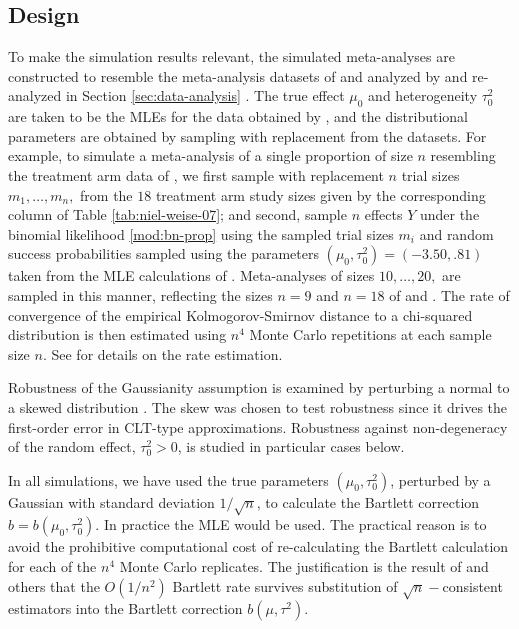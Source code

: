\documentclass[12pt]{article}
\newcommand{\Y}{Y}
\newcommand{\n}{n}
\newcommand{\munull}{\mu_0}
\newcommand{\tausqnull}{\tau^2_{0}}
\begin{document}
\subsection{Design}
To make the simulation results relevant, the simulated meta-analyses
are constructed to resemble the meta-analysis datasets of \citet{niel:07} and \citet{niel:08}  analyzed by
\citet{stijnen:10} and re-analyzed in Section
\ref{sec:data-analysis}%
. The true effect $\munull$ and heterogeneity $\tausqnull$ are taken
to be the MLEs for the data obtained by \citet{stijnen:10}, and the
distributional parameters are obtained by sampling with replacement
from the datasets. For example, to simulate a meta-analysis of a
single proportion of size $\n$ resembling the treatment arm data of \citet{niel:07},
we first sample with replacement $\n$ trial sizes $m_1,\ldots,m_{\n},$
from the $18$ treatment arm study sizes given by the corresponding
column of Table \ref{tab:niel-weise-07}; and second, sample $\n$
effects $\Y$ under the binomial likelihood \eqref{mod:bn-prop} using
the sampled trial sizes $m_i$ and random success probabilities sampled using the parameters $(\munull,\tausqnull)=(-3.50,.81)$ taken from the
MLE calculations of \citet{stijnen:10}. Meta-analyses of sizes
$10,\ldots,20,$  are sampled in this manner, reflecting the sizes $\n=9$ and $\n=18$ of \citet{niel:07} and \citet{niel:08}. The
rate of convergence of the empirical Kolmogorov-Smirnov distance to a
chi-squared distribution is then estimated using $\n^4$ Monte Carlo
repetitions at each sample size $\n$. See \citet{michael:ma-bartlett}
for details on the rate estimation.

Robustness of the Gaussianity assumption is examined by perturbing a
normal to a skewed distribution \citep{jones:09}. The skew
was chosen to test robustness since it drives the first-order error in
CLT-type approximations. Robustness against non-degeneracy of the
random effect, $\tausqnull>0$, is studied in particular cases
below.%

In all simulations, we have used the true parameters
$(\munull,\tausqnull)$, perturbed by a Gaussian with standard deviation
$1/\sqrt\n$, to calculate the Bartlett correction
$b=b(\munull,\tausqnull)$. In practice the MLE would be used. The practical
reason is to avoid the prohibitive computational cost of
re-calculating the Bartlett calculation for each of the $\n^4$ Monte
Carlo replicates. The justification is the result of \citet{lawley:56,barndorff:88} and others that the $O(1/\n^2)$ Bartlett rate survives substitution of $\sqrt\n-$consistent estimators into the Bartlett correction $b(\mu,\tau^2)$.
\end{document}
